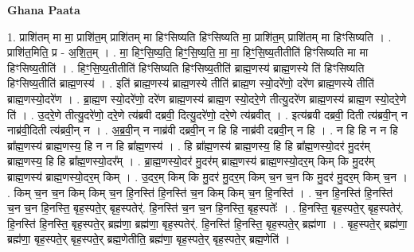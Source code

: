\documentclass[17pt]{extarticle}
\begin{document}
\textbf{Ghana Paata } \newline

1. प्राशि॑तम् मा मा॒ प्राशि॑त॒म् प्राशि॑तम् मा हिꣳसिष्यति हिꣳसिष्यति मा॒ प्राशि॑त॒म् प्राशि॑तम् मा हिꣳसिष्यति । . प्राशि॑त॒मिति॒ प्र - अ॒शि॒त॒म् । . मा॒ हिꣳ॒॒सि॒ष्य॒ति॒ हिꣳ॒॒सि॒ष्य॒ति॒ मा॒ मा॒ हिꣳ॒॒सि॒ष्य॒तीतीति॑ हिꣳसिष्यति मा मा हिꣳसिष्य॒तीति॑ । . हिꣳ॒॒सि॒ष्य॒तीतीति॑ हिꣳसिष्यति हिꣳसिष्य॒तीति॑ ब्राह्म॒णस्य॑ ब्राह्म॒णस्ये ति॑ हिꣳसिष्यति हिꣳसिष्य॒तीति॑ ब्राह्म॒णस्य॑ । . इति॑ ब्राह्म॒णस्य॑ ब्राह्म॒णस्ये तीति॑ ब्राह्म॒ण स्यो॒दरे॑णो॒ दरे॑ण ब्राह्म॒णस्ये तीति॑ ब्राह्म॒णस्यो॒दरे॑ण । . ब्रा॒ह्म॒ण स्यो॒दरे॑णो॒ दरे॑ण ब्राह्म॒णस्य॑ ब्राह्म॒ण स्यो॒दरे॒णे तीत्यु॒दरे॑ण ब्राह्म॒णस्य॑ ब्राह्म॒ण स्यो॒दरे॒णे ति॑ । . उ॒दरे॒णे तीत्यु॒दरे॑णो॒ दरे॒णे त्य॑ब्रवी दब्रवी॒ दित्यु॒दरे॑णो॒ दरे॒णे त्य॑ब्रवीत् । . इत्य॑ब्रवी दब्रवी॒ दिती त्य॑ब्रवी॒न् न नाब्र॑वी॒दिती त्य॑ब्रवी॒न् न । . अ॒ब्र॒वी॒न् न नाब्र॑वी दब्रवी॒न् न हि हि नाब्र॑वी दब्रवी॒न् न हि । . न हि हि न न हि ब्रा᳚ह्म॒णस्य॑ ब्राह्म॒णस्य॒ हि न न हि ब्रा᳚ह्म॒णस्य॑ । . हि ब्रा᳚ह्म॒णस्य॑ ब्राह्म॒णस्य॒ हि हि ब्रा᳚ह्म॒णस्यो॒दर॑ मु॒दर॑म् ब्राह्म॒णस्य॒ हि हि ब्रा᳚ह्म॒णस्यो॒दर᳚म् । . ब्रा॒ह्म॒णस्यो॒दर॑ मु॒दर॑म् ब्राह्म॒णस्य॑ ब्राह्म॒णस्यो॒दर॒म् किम् कि मु॒दर॑म् ब्राह्म॒णस्य॑ ब्राह्म॒णस्यो॒दर॒म् किम् । . उ॒दर॒म् किम् कि मु॒दर॑ मु॒दर॒म् किम् च॒न च॒न कि मु॒दर॑ मु॒दर॒म् किम् च॒न । . किम् च॒न च॒न किम् किम् च॒न हि॒नस्ति॑ हि॒नस्ति॑ च॒न किम् किम् च॒न हि॒नस्ति॑ । . च॒न हि॒नस्ति॑ हि॒नस्ति॑ च॒न च॒न हि॒नस्ति॒ बृह॒स्पते॒र् बृह॒स्पतेर्॑. हि॒नस्ति॑ च॒न च॒न हि॒नस्ति॒ बृह॒स्पतेः᳚ । . हि॒नस्ति॒ बृह॒स्पते॒र् बृह॒स्पतेर्॑. हि॒नस्ति॑ हि॒नस्ति॒ बृह॒स्पते॒र् ब्रह्म॑णा॒ ब्रह्म॑णा॒ बृह॒स्पतेर्॑. हि॒नस्ति॑ हि॒नस्ति॒ बृह॒स्पते॒र् ब्रह्म॑णा । . बृह॒स्पते॒र् ब्रह्म॑णा॒ ब्रह्म॑णा॒ बृह॒स्पते॒र् बृह॒स्पते॒र् ब्रह्म॒णेतीति॒ ब्रह्म॑णा॒ बृह॒स्पते॒र् बृह॒स्पते॒र् ब्रह्म॒णेति॑ । \newline
\end{document}
